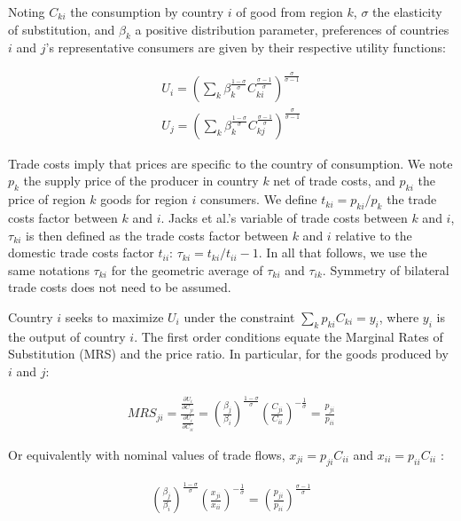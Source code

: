 \documentclass{article}
\begin{document}
Noting $C_{ki}$ the consumption by country $i$ of good from
region $k$, $\sigma$ the elasticity of substitution, and
$\beta_k$ a positive distribution parameter, preferences of
countries $i$ and $j$'s representative consumers are given by
their respective utility functions:

\begin{eqnarray*}
U_i=\left(\sum_k\beta_{k}^{\frac{1-\sigma}{\sigma}}C_{ki}^{\frac{\sigma-1}{\sigma}}\right)^{\frac{\sigma}{\sigma-1}}\\
U_j=\left(\sum_k\beta_{k}^{\frac{1-\sigma}{\sigma}}C_{kj}^{\frac{\sigma-1}{\sigma}}\right)^{\frac{\sigma}{\sigma-1}}
\end{eqnarray*}

Trade costs imply that prices are specific to the country of
consumption. We note $p_k$ the supply price of the producer in
country $k$ net of trade costs, and $p_{ki}$ the price of
region $k$ goods for region $i$ consumers. We define
$t_{ki}=p_{ki}/p_{k}$ the trade costs factor between $k$ and
$i$. Jacks et al.'s variable of trade costs between $k$ and
$i$, $\tau_{ki}$ is then defined as the trade costs factor
between $k$ and $i$ relative to the domestic trade costs factor
$t_{ii}$: $\tau_{ki}=t_{ki}/t_{ii}-1$. In all that follows, we
use the same notations $\tau_{ki}$ for the geometric average of
$\tau_{ki}$ and $\tau_{ik}$. Symmetry of bilateral trade costs
does not need to be assumed.

Country $i$ seeks to maximize $U_i$ under the constraint
$\sum_k p_{ki} C_{ki}=y_i$, where $y_i$ is the output of
country $i$. The first order conditions equate the Marginal
Rates of Substitution (MRS) and the price ratio. In particular,
for the goods produced by $i$ and $j$:

\begin{eqnarray*}
MRS_{ji}=\frac{\frac{\partial U_i}{\partial C_{ji}}}{\frac{\partial
U_i}{\partial C_{ii}}}=
\left(\frac{\beta_j}{\beta_i}\right)^{\frac{1-\sigma}{\sigma}}\left(\frac{C_{ji}}{C_{ii}}\right)^{-\frac{1}{\sigma}}=\frac{p_{ji}}{p_{ii}}
\end{eqnarray*}

Or equivalently with nominal values of trade flows,
$x_{ji}=p_{ji}C_{ii}$ and $x_{ii}=p_{ii}C_{ii}$ :

\begin{eqnarray*}
\left(\frac{\beta_j}{\beta_i}\right)^{\frac{1-\sigma}{\sigma}}\left(\frac{x_{ji}}{x_{ii}}\right)^{-\frac{1}{\sigma}}=\left(\frac{p_{ji}}{p_{ii}}\right)^{\frac{\sigma-1}{\sigma}}
\end{eqnarray*}
\end{document}
